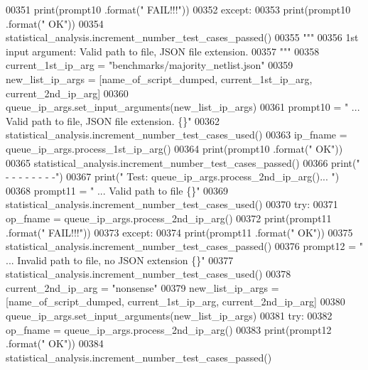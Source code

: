 \begin{DoxyCode}
00351             print(prompt10 .format(\textcolor{stringliteral}{"        FAIL!!!"}))
00352         \textcolor{keywordflow}{except}:
00353             print(prompt10 .format(\textcolor{stringliteral}{"    OK"}))
00354             statistical\_analysis.increment\_number\_test\_cases\_passed()
00355         \textcolor{stringliteral}{"""}
00356 \textcolor{stringliteral}{            1st input argument: Valid path to file, JSON file extension.}
00357 \textcolor{stringliteral}{        """}
00358         current\_1st\_ip\_arg = \textcolor{stringliteral}{"benchmarks/majority\_netlist.json"}
00359         new\_list\_ip\_args = [name\_of\_script\_dumped, current\_1st\_ip\_arg, current\_2nd\_ip\_arg]
00360         queue\_ip\_args.set\_input\_arguments(new\_list\_ip\_args)
00361         prompt10 = \textcolor{stringliteral}{"    ... Valid path to file, JSON file extension.    \{\}"}
00362         statistical\_analysis.increment\_number\_test\_cases\_used()
00363         ip\_fname = queue\_ip\_args.process\_1st\_ip\_arg()
00364         print(prompt10 .format(\textcolor{stringliteral}{"    OK"}))
00365         statistical\_analysis.increment\_number\_test\_cases\_passed()
00366         print(\textcolor{stringliteral}{" -   -   -   -   -   -   -   -"})
00367         print(\textcolor{stringliteral}{" Test: queue\_ip\_args.process\_2nd\_ip\_arg()... "})
00368         prompt11 = \textcolor{stringliteral}{"    ... Valid path to file  \{\}"}
00369         statistical\_analysis.increment\_number\_test\_cases\_used()
00370         \textcolor{keywordflow}{try}:
00371             op\_fname = queue\_ip\_args.process\_2nd\_ip\_arg()
00372             print(prompt11 .format(\textcolor{stringliteral}{"                FAIL!!!"}))
00373         \textcolor{keywordflow}{except}:
00374             print(prompt11 .format(\textcolor{stringliteral}{"                OK"}))
00375             statistical\_analysis.increment\_number\_test\_cases\_passed()
00376         prompt12 = \textcolor{stringliteral}{"    ... Invalid path to file, no JSON extension \{\}"}
00377         statistical\_analysis.increment\_number\_test\_cases\_used()
00378         current\_2nd\_ip\_arg = \textcolor{stringliteral}{"nonsense"}
00379         new\_list\_ip\_args = [name\_of\_script\_dumped, current\_1st\_ip\_arg, current\_2nd\_ip\_arg]
00380         queue\_ip\_args.set\_input\_arguments(new\_list\_ip\_args)
00381         \textcolor{keywordflow}{try}:
00382             op\_fname = queue\_ip\_args.process\_2nd\_ip\_arg()
00383             print(prompt12 .format(\textcolor{stringliteral}{"    OK"}))
00384             statistical\_analysis.increment\_number\_test\_cases\_passed()

\end{DoxyCode}
